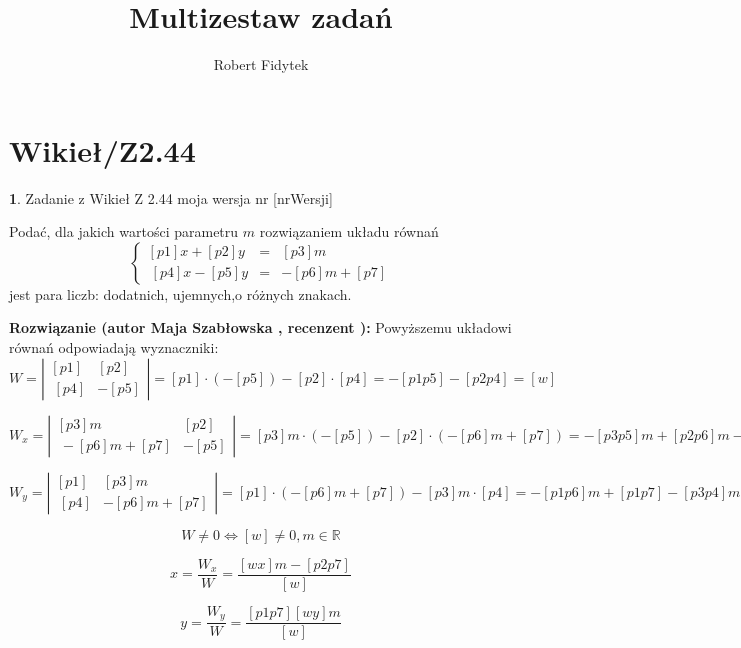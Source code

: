 \documentclass[12pt, a4paper]{article}
\title{Multizestaw zadań}
\author{Robert Fidytek}
\date{}
\theoremstyle{definition} %
\newtheorem{zad}{}
\newcommand{\kategoria}[1]{\section{#1}} %
\newcommand{\zadStart}[1]{\begin{zad}#1\newline} %
\newcommand{\zadStop}{\end{zad}}   %
\newcommand{\rozwStart}[2]{\noindent \textbf{Rozwiązanie (autor #1 , recenzent #2): }\newline} %
\begin{document}
\maketitle


\kategoria{Wikieł/Z2.44}
\zadStart{Zadanie z Wikieł Z 2.44  moja wersja nr [nrWersji]}

Podać, dla jakich wartości parametru $m$ rozwiązaniem układu równań
$$\left\{\begin{array}{ccc}
[p1]x+[p2]y&=&[p3]m\\
\ [p4]x-[p5]y&=&-[p6]m+[p7]
\end{array} \right.$$
jest para liczb: dodatnich, ujemnych,o różnych znakach. 
\zadStop

\rozwStart{Maja Szabłowska}{}
Powyższemu układowi równań odpowiadają wyznaczniki:
$$W=\left| \begin{array}{lccr} [p1] & [p2] \\ \ [p4] & -[p5] \end{array}\right| = [p1]\cdot(-[p5]) - [p2]\cdot[p4]=-[p1p5]-[p2p4]=[w]$$

$$W_{x}=\left| \begin{array}{lccr} [p3]m & [p2] \\ \ -[p6]m+[p7] & -[p5] \end{array}\right| = [p3]m\cdot(-[p5]) - [p2]\cdot(-[p6]m+[p7])=-[p3p5]m+[p2p6]m-[p2p7]=[wx]m-[p2p7]$$

$$W_{y}=\left| \begin{array}{lccr} [p1] & [p3]m \\ \ [p4] & -[p6]m+[p7] \end{array}\right| = [p1]\cdot(-[p6]m+[p7]) - [p3]m\cdot[p4]=-[p1p6]m+[p1p7]-[p3p4]m=[p1p7][wy]m$$

$$W\neq 0 \iff [w] \neq 0, m\in\mathbb{R} $$

$$x=\frac{W_{x}}{W}=\frac{[wx]m-[p2p7]}{[w]}$$

$$y=\frac{W_{y}}{W}=\frac{[p1p7][wy]m}{[w]}$$
\end{document}
